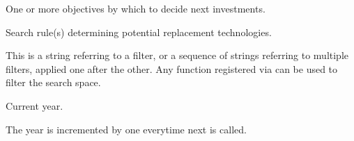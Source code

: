 \documentclass[letterpaper,10pt,english]{sphinxmanual}
\begin{document}
\begin{fulllineitems}
\begin{fulllineitems}
\end{fulllineitems}


\begin{fulllineitems}
\label{\detokenize{api:muse.agents.agent.Agent.objectives}}
One or more objectives by which to decide next investments.

\end{fulllineitems}


\begin{fulllineitems}
\label{\detokenize{api:muse.agents.agent.Agent.search_rules}}
Search rule(s) determining potential replacement technologies.

This is a string referring to a filter, or a sequence of strings
referring to multiple filters, applied one after the other.  Any
function registered via  can be
used to filter the search space.

\end{fulllineitems}


\begin{fulllineitems}
\label{\detokenize{api:muse.agents.agent.Agent.year}}
Current year.

The year is incremented by one everytime next is called.

\end{fulllineitems}


\end{fulllineitems}

\end{document}
